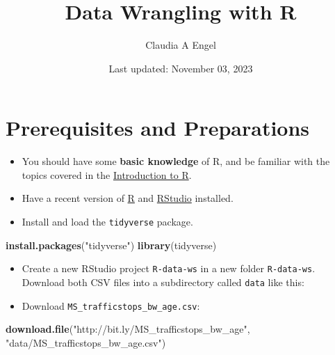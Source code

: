 \documentclass[
]{book}
\title{Data Wrangling with R}
\author{Claudia A Engel}
\date{Last updated: November 03, 2023}
\newenvironment{Shaded}{\begin{snugshade}}{\end{snugshade}}
\newcommand{\FunctionTok}[1]{\textcolor[rgb]{0.13,0.29,0.53}{\textbf{#1}}}
\newcommand{\NormalTok}[1]{#1}
\newcommand{\StringTok}[1]{\textcolor[rgb]{0.31,0.60,0.02}{#1}}
\providecommand{\tightlist}{%
  \setlength{\itemsep}{0pt}\setlength{\parskip}{0pt}}
\begin{document}
\maketitle

{
\setcounter{tocdepth}{1}
\tableofcontents
}
\hypertarget{prerequisites-and-preparations}{%
\chapter*{Prerequisites and Preparations}\label{prerequisites-and-preparations}}

\begin{itemize}
\tightlist
\item
  You should have some \textbf{basic knowledge} of R, and be familiar with the topics covered in the \href{https://cengel.github.io/R-intro/}{Introduction to R}.
\item
  Have a recent version of \href{https://cran.r-project.org/}{R} and \href{https://www.rstudio.com/}{RStudio} installed.
\item
  Install and load the \texttt{tidyverse} package.
\end{itemize}

\begin{Shaded}
\begin{Highlighting}[]
\FunctionTok{install.packages}\NormalTok{(}\StringTok{"tidyverse"}\NormalTok{)  }
\FunctionTok{library}\NormalTok{(tidyverse)}
\end{Highlighting}
\end{Shaded}

\begin{itemize}
\tightlist
\item
  Create a new RStudio project \texttt{R-data-ws} in a new folder \texttt{R-data-ws}. Download both CSV files into a subdirectory called \texttt{data} like this:
\item
  Download \texttt{MS\_trafficstops\_bw\_age.csv}:
\end{itemize}

\begin{Shaded}
\begin{Highlighting}[]
\FunctionTok{download.file}\NormalTok{(}\StringTok{"http://bit.ly/MS\_trafficstops\_bw\_age"}\NormalTok{,}
              \StringTok{"data/MS\_trafficstops\_bw\_age.csv"}\NormalTok{)}
\end{Highlighting}
\end{Shaded}
\end{document}
